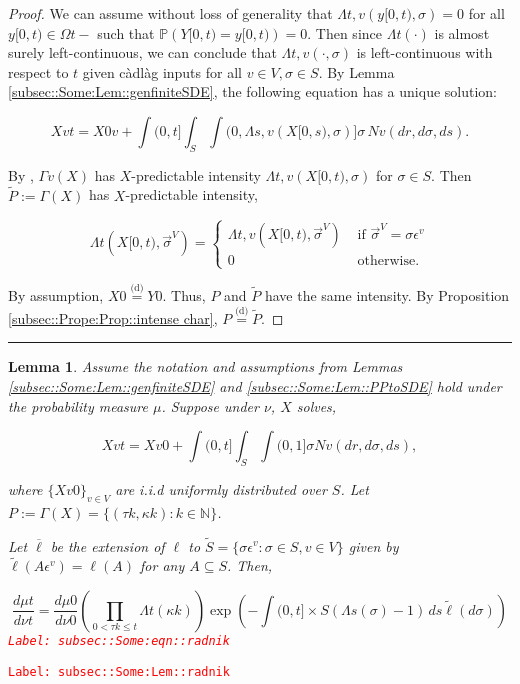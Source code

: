 \documentclass[12pt]{article}
\newcommand{\mb}{\mathbb}
\newcommand{\ov}{\overline}
\newcommand{\te}{\text}
\newcommand{\ep}{\epsilon}
\newcommand{\tr}{\textcolor{red}}
\newcommand{\labe}[1]{\tr{\texttt{Label: #1}}}
\newcommand{\ind}{\hspace{24pt}}
\newcommand{\lin}{\rule{\linewidth}{0.4 pt}}
\newcommand{\pr}{\mb{P}}							%
\newcommand{\deq}{\overset{\text{(d)}}{=}}			%
\newcommand{\defeq}{:=}								%
\renewcommand{\v}{v}							%
\renewcommand{\S}{S}							%
\newcommand{\s}{\sigma}							%
\newcommand{\sv}{\vec{\s}}						%
\newcommand{\ev}{\ep}							%
\renewcommand{\t}{t}							%
\renewcommand{\tt}{s}							%
\newcommand{\X}{X}								%
\newcommand{\vind}[1]{^{#1}}					%
\newcommand{\vsi}[1]{^{#1}}						%
\newcommand{\cind}[1]{_{#1}}					%
\newcommand{\poiss}{N}							%
\newcommand{\Sm}{\ell}							%
\renewcommand{\r}{r}							%
\newcommand{\alt}[1]{\widetilde{#1}}			%
\newcommand{\m}{\mu}							%
\newcommand{\mm}{\nu}							%
\newcommand{\XX}{Y}								%
\newcommand{\rt}{\tau}							%
\renewcommand{\it}{k}							%
\newcommand{\pmap}{\Gamma}						%
\renewcommand{\mark}{\kappa}					%
\newcommand{\rp}{P}								%
\newcommand{\typset}{A}							%
\newcommand{\ratee}{\Lambda}					%
\newcommand{\xx}{y}								%
\newtheorem{lem}[thms]{Lemma}
\begin{document}
\begin{proof}

We can assume without loss of generality that \(\ratee{\t,\v}(\xx{}{[0,\t)},\s) = 0\) for all \(\xx{}{[0,\t)}\in \Omega{}{\t-}\) such that \(\pr(\XX{}{[0,\t)} = \xx{}{[0,\t)}) = 0\). Then since \(\ratee{\t}(\cdot)\) is almost surely left-continuous, we can conclude that \(\ratee{\t,\v}(\cdot,\s)\) is left-continuous with respect to \(\t\) given c\`adl\`ag inputs for all \(\v\in V,\s\in\S\). By Lemma \ref{subsec::Some:Lem::genfiniteSDE}, the following equation has a unique solution:

\[\X{\v}{\t} = \X{0}{\v} + \int{(0,\t]}\int_\S\int{(0,\ratee{\tt,\v}(\X{}{[0,\tt)},\s)]}  \s\,\poiss{\v}(d\r,d\s,d\tt).\]

By \cite[Exercise 14.7.1]{DalVer08}, \(\pmap{\v}(\X{}{})\) has \(\X{}{}\)-predictable intensity \(\ratee{\t,\v}(\X{}{[0,\t)},\s)\) for \(\s \in \S\). Then \(\alt{\rp{}} \defeq \pmap{}(\X{}{})\) has \(\X{}{}\)-predictable intensity,

\[\ratee{\t}(\X{}{[0,\t)},\sv\cind{}\vsi{V}) = \begin{cases}
\ratee{\t,\v}(\X{}{[0,\t)},\sv\cind{}\vsi{V}) &\te{ if } \sv\cind{}\vsi{V} = \s\ev\vind{\v}\\
0&\te{ otherwise.}
\end{cases}\]

By assumption, \(\X{}{0} \deq \XX{}{0}\). Thus, \(\rp{}\) and \(\alt{\rp{}}\) have the same intensity. By Proposition \ref{subsec::Prope:Prop::intense char}, \(\rp{} \deq \alt{\rp{}}\).
\end{proof}
\lin

\begin{lem}
Assume the notation and assumptions from Lemmas \ref{subsec::Some:Lem::genfiniteSDE} and \ref{subsec::Some:Lem::PPtoSDE} hold under the probability measure \(\m{}{}{}\). Suppose under \(\mm{}{}{}\), \(\X{}{}\) solves,

\[\X{\v}{\t} = \X{\v}{0} +\int{(0,\t]}\int_\S\int{(0,1]} \s \poiss{\v}(d\r,d\s,d\tt),\]

where \(\{\X{\v}{0}\}_{\v \in V}\) are i.i.d uniformly distributed over \(\S\). Let \(\rp{} \defeq \pmap{}(\X{}{}) = \{(\rt{\it},\mark{\it}):\it\in \mb{N}\}\).

\ind Let \(\ov{\ell}\) be the extension of \(\Sm\) to \(\alt{\S} = \{\s\ev\vind{\v}: \s \in \S, \v \in V\}\) given by \(\alt{\Sm}(\typset\ev\vind{\v}) = \Sm(\typset)\) for any \(\typset \subseteq \S\). Then,

\begin{equation}
\frac{d\m{}{\t}{}}{d\mm{}{\t}{}}= \frac{d\m{}{0}{}}{d\mm{}{0}{}}\left(\prod_{0< \rt{\it}\leq \t} \ratee{\t}(\mark{\it})\right)\exp\left(-\int{(0,\t]\times \S} (\ratee{\tt}(\s) - 1)\,d\tt\alt{\Sm}(d\s)\right)
\label{subsec::Some:eqn::radnik}
\end{equation}
\labe{subsec::Some:eqn::radnik}
\label{subsec::Some:Lem::radnik}
\end{lem}
\labe{subsec::Some:Lem::radnik}
\end{document}
